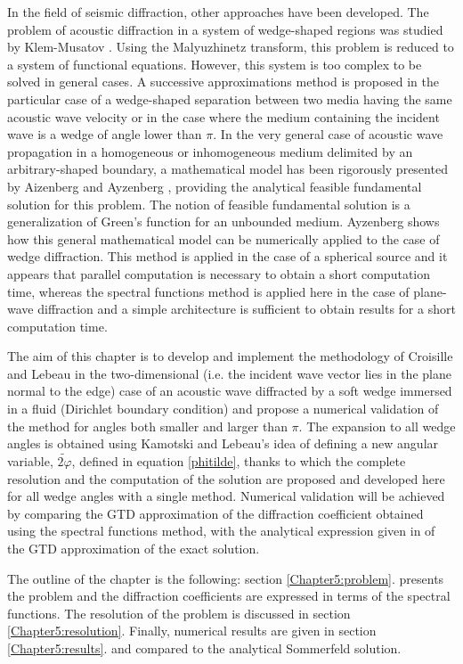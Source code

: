 In the field of seismic diffraction, other approaches have been developed. The problem of acoustic diffraction in a system of wedge-shaped regions was studied by Klem-Musatov \cite{Klem-Musatov}. Using the Malyuzhinetz transform, this problem is reduced to a system of functional equations. However, this system is too complex to be solved in general cases. A successive approximations method is proposed in the particular case of a wedge-shaped separation between two media having the same acoustic wave velocity or  in the case where the medium containing the incident wave is a wedge of angle lower than $\pi$. In the very general case of acoustic wave propagation in a homogeneous or inhomogeneous medium delimited by an arbitrary-shaped boundary, a mathematical model has been rigorously presented by Aizenberg and Ayzenberg \cite{Aizenberg}, providing the analytical feasible fundamental solution for this problem. The notion of feasible fundamental solution is a generalization of Green's function for an unbounded medium. Ayzenberg \cite{Ayzenberg} shows how this general mathematical model can be numerically applied to the case of wedge diffraction. This method is applied in the case of a spherical source and it appears that parallel computation is necessary to obtain a short computation time, whereas the spectral functions method is applied here in the case of plane-wave diffraction and a simple architecture is sufficient to obtain results for a short computation time. 

The aim of this chapter is to develop and implement the methodology of Croisille and Lebeau \cite{CroisilleLebeau} in the two-dimensional (i.e. the incident wave vector lies in the plane normal to the edge) case of an acoustic wave diffracted by a soft wedge immersed in a fluid (Dirichlet boundary condition) and propose a numerical validation of the method for angles both smaller and larger than $\pi$.  The expansion to all wedge angles is obtained using Kamotski and Lebeau's \cite{KamotskiLebeau} idea of defining a new angular variable, $\widetilde{2\varphi}$, defined in equation \eqref{phitilde}, thanks to which the complete resolution and the computation of the solution are proposed and developed here for all wedge angles with a single method. Numerical validation will be achieved by comparing the GTD approximation of the diffraction coefficient obtained using the spectral functions method, with the analytical expression given in \cite{Bouche,Bo} of the GTD approximation of the exact solution. 

The outline of the chapter is the following: section \ref{Chapter5:problem}. presents the problem and the diffraction coefficients are expressed in terms of the spectral functions. The resolution of the problem is discussed in section \ref{Chapter5:resolution}. Finally, numerical results are given in section \ref{Chapter5:results}. and compared to the analytical Sommerfeld solution. 

